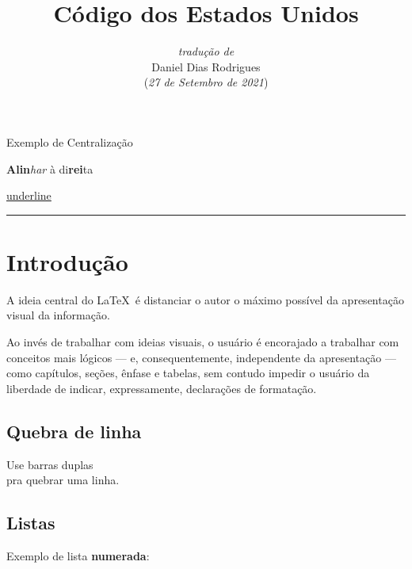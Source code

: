 \documentclass[a4paper, 12pt]{article}
\title{\textbf{Código dos Estados Unidos}}
\author{\textit{tradução de}\\Daniel Dias Rodrigues\\ (\textit{27 de Setembro de 2021})}
\date{}
\begin{document}
\maketitle

\tableofcontents

\begin{center}
Exemplo de Centralização
\end{center}

\begin{flushright}
\textbf{Alin}\textit{har} à di\textbf{rei}ta
\end{flushright}

\underline{underline}

\begin{center}
\rule{7cm}{0.4pt}
\end{center}

\section{Introdução}

A ideia central do \LaTeX\ é distanciar o autor o máximo possível da apresentação visual da informação.

Ao invés de trabalhar com ideias visuais, o usuário é encorajado a trabalhar com conceitos mais lógicos --- e, consequentemente, independente da apresentação --- como capítulos, seções, ênfase e tabelas, sem contudo impedir o usuário da liberdade de indicar, expressamente, declarações de formatação.


\subsection{Quebra de linha}

Use barras duplas\\ pra quebrar uma linha.

\subsection{Listas}

Exemplo de lista \textbf{numerada}:

\end{document}
